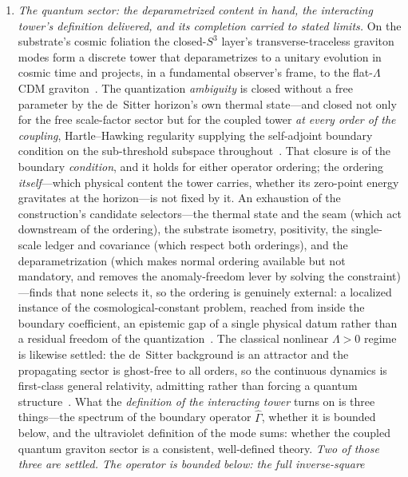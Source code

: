 \documentclass[11pt,a4paper]{article}
\theoremstyle{plain}
\theoremstyle{definition}
\theoremstyle{remark}
\begin{document}
\begin{enumerate}
\item\label{frontier:quantum} \emph{The quantum sector: the deparametrized content in hand, the interacting tower's definition delivered, and its completion carried to stated limits.} On the substrate's cosmic foliation the closed-$S^3$ layer's transverse-traceless graviton modes form a discrete tower that deparametrizes to a unitary evolution in cosmic time and projects, in a fundamental observer's frame, to the flat-$\Lambda$CDM graviton~\cite{JanzenCanonicalTime}. The quantization \emph{ambiguity} is closed without a free parameter by the de~Sitter horizon's own thermal state---and closed not only for the free scale-factor sector but for the coupled tower \emph{at every order of the coupling}, Hartle--Hawking regularity supplying the self-adjoint boundary condition on the sub-threshold subspace throughout~\cite{JanzenCanonicalTime}. That closure is of the boundary \emph{condition}, and it holds for either operator ordering; the ordering \emph{itself}---which physical content the tower carries, whether its zero-point energy gravitates at the horizon---is not fixed by it. An exhaustion of the construction's candidate selectors---the thermal state and the seam (which act downstream of the ordering), the substrate isometry, positivity, the single-scale ledger and covariance (which respect both orderings), and the deparametrization (which makes normal ordering available but not mandatory, and removes the anomaly-freedom lever by solving the constraint)---finds that none selects it, so the ordering is genuinely external: a localized instance of the cosmological-constant problem, reached from inside the boundary coefficient, an epistemic gap of a single physical datum rather than a residual freedom of the quantization~\cite{JanzenCanonicalTime}. The classical nonlinear $\Lambda>0$ regime is likewise settled: the de~Sitter background is an attractor and the propagating sector is ghost-free to all orders, so the continuous dynamics is first-class general relativity, admitting rather than forcing a quantum structure~\cite{JanzenDynamics,JanzenAlgebroid}. What the \emph{definition of the interacting tower} turns on is three things---the spectrum of the boundary operator $\hat\Gamma$, whether it is bounded below, and the ultraviolet definition of the mode sums: whether the coupled quantum graviton sector is a consistent, well-defined theory.
\emph{Two of those three are settled.  The operator is bounded below: the full inverse-square
}
\end{enumerate}
\end{document}
